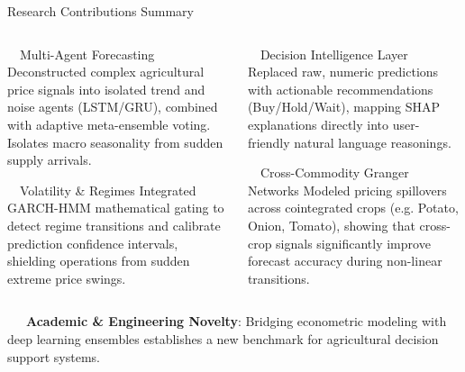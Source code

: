 \documentclass{beamer}
\begin{document}
\begin{frame}{Research Contributions Summary}
\vspace{-0.2cm}

\begin{columns}[T]
    \begin{column}{0.48\textwidth}
        \begin{infocard}[height=2.5cm]{~~Multi-Agent Forecasting}
            \fontsize{6.2pt}{7.5pt}\selectfont
            Deconstructed complex agricultural price signals into isolated trend and noise agents (LSTM/GRU), combined with adaptive meta-ensemble voting. Isolates macro seasonality from sudden supply arrivals.
        \end{infocard}
        \vspace{0.1cm}
        \begin{alertcard}[height=2.5cm]{~~Volatility \& Regimes}
            \fontsize{6.2pt}{7.5pt}\selectfont
            Integrated GARCH-HMM mathematical gating to detect regime transitions and calibrate prediction confidence intervals, shielding operations from sudden extreme price swings.
        \end{alertcard}
    \end{column}
    
    \begin{column}{0.48\textwidth}
        \begin{successcard}[height=2.5cm]{~~Decision Intelligence Layer}
            \fontsize{6.2pt}{7.5pt}\selectfont
            Replaced raw, numeric predictions with actionable recommendations (Buy/Hold/Wait), mapping SHAP explanations directly into user-friendly natural language reasonings.
        \end{successcard}
        \vspace{0.1cm}
        \begin{purplecard}[height=2.5cm]{~~Cross-Commodity Granger Networks}
            \fontsize{6.2pt}{7.5pt}\selectfont
            Modeled pricing spillovers across cointegrated crops (e.g. Potato, Onion, Tomato), showing that cross-crop signals significantly improve forecast accuracy during non-linear transitions.
        \end{purplecard}
    \end{column}
\end{columns}

\vspace{0.15cm}
\begin{tcolorbox}[enhanced, colback=primaryblue!4, colframe=primaryblue!30, boxrule=0.35pt,
  arc=3.5pt, width=0.98\textwidth, left=4pt, right=4pt, top=2.5pt, bottom=2.5pt, boxsep=0pt,
  halign=center, shadow={0.5pt}{-0.5pt}{0pt}{black!8}]
    \fontsize{5.5pt}{6.5pt}\selectfont
    \textcolor{primaryDark}{~~~\textbf{Academic \& Engineering Novelty}: Bridging econometric modeling with deep learning ensembles establishes a new benchmark for agricultural decision support systems.}
\end{tcolorbox}
\end{frame}
\end{document}
